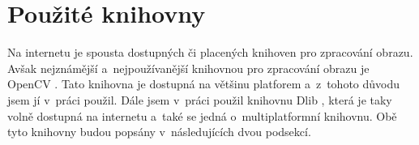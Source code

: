 \section{Použité knihovny}
Na internetu je spousta dostupných či placených knihoven pro zpracování obrazu. Avšak nejznámější a~nejpoužívanější knihovnou pro zpracování obrazu je OpenCV \cite{opencvdoc}. Tato knihovna je dostupná na většinu platforem a~z~tohoto důvodu jsem jí v~práci použil. Dále jsem v~práci použil knihovnu Dlib \cite{dlibdoc}, která je taky volně dostupná na internetu a~také se jedná o~multiplatformní knihovnu. Obě tyto knihovny budou popsány v~následujících dvou podsekcí.